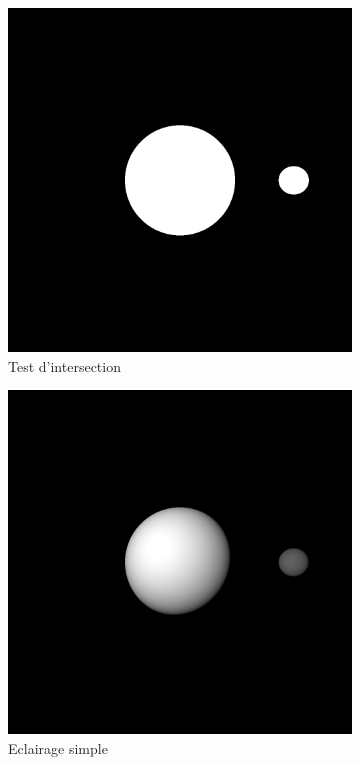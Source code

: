 \documentclass[12pt,a4paper,twoside]{report}
\begin{document}
\begin{figure}[H]
	\centering
	\begin{subfigure}{.45\textwidth}
		\centering
		\includegraphics[width=1.\linewidth]{be1_01}
		\caption{Test d'intersection}
		\label{fig:be1_01}
	\end{subfigure}
	\begin{subfigure}{.45\textwidth}
		\centering
		\includegraphics[width=1.\linewidth]{be1_02}
		\caption{Eclairage simple}
		\label{fig:be1_02}
	\end{subfigure}
	\caption{}
\end{figure}
\end{document}
